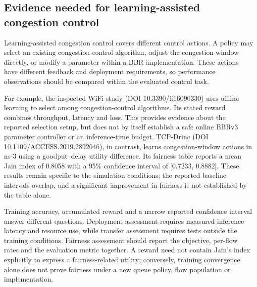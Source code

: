 \subsection{Evidence needed for learning-assisted congestion control}
Learning-assisted congestion control covers different control actions. A policy
may select an existing congestion-control algorithm, adjust the congestion
window directly, or modify a parameter within a BBR implementation. These
actions have different feedback and deployment requirements, so performance
observations should be compared within the evaluated control task.

For example, the inspected WiFi study (DOI 10.3390/fi16090330) uses offline
learning to select among congestion-control algorithms. Its stated reward
combines throughput, latency and loss. This provides evidence about the
reported selection setup, but does not by itself establish a safe online
BBRv3 parameter controller or an inference-time budget. TCP-Drinc
(DOI 10.1109/ACCESS.2019.2892046), in contrast, learns congestion-window
actions in ns-3 using a goodput--delay utility difference. Its fairness table
reports a mean Jain index of 0.8058 with a 95\% confidence interval of
[0.7233, 0.8882]. These results remain specific to the simulation conditions;
the reported baseline intervals overlap, and a significant improvement in
fairness is not established by the table alone.

Training accuracy, accumulated reward and a narrow reported confidence
interval answer different questions. Deployment assessment requires measured
inference latency and resource use, while transfer assessment requires tests
outside the training conditions. Fairness assessment should report the
objective, per-flow rates and the evaluation metric together. A reward need
not contain Jain's index explicitly to express a fairness-related utility;
conversely, training convergence alone does not prove fairness under a new
queue policy, flow population or implementation.

